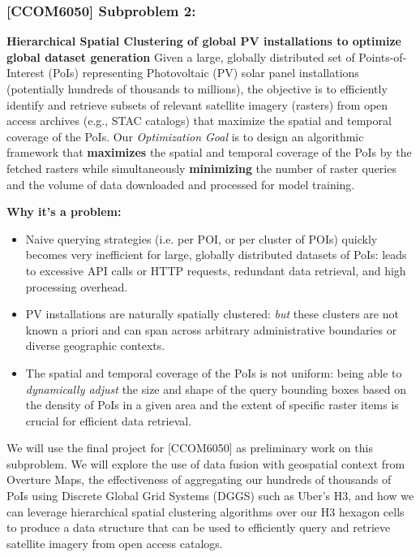 \subsubsection{[CCOM6050] Subproblem 2:} 
    \textbf{Hierarchical Spatial Clustering of global PV installations to optimize global dataset generation} 
    Given a large, globally distributed set of Points-of-Interest (PoIs) representing Photovoltaic (PV) solar panel installations (potentially hundreds of thousands to millions), 
    the objective is to efficiently identify and retrieve subsets of relevant satellite imagery (rasters) from open access archives (e.g., STAC catalogs) that maximize the spatial and temporal coverage of the PoIs. 
    Our \textit{Optimization Goal} is to design an algorithmic framework that \textbf{maximizes} the spatial and temporal coverage of the PoIs by the fetched rasters while simultaneously 
    \textbf{minimizing} the number of raster queries and the volume of data downloaded and processed for model training. 

    \textbf{Why it's a problem:} 
    \begin{itemize}
        \item Naive querying strategies (i.e. per POI, or per cluster of POIs) quickly becomes very inefficient for large, globally distributed datasets of PoIs: 
        leads to excessive API calls or HTTP requests, redundant data retrieval, and high processing overhead.
        \item PV installations are naturally spatially clustered: \textit{but} these clusters are not known a priori and can span across arbitrary administrative boundaries or diverse geographic contexts.
        \item The spatial and temporal coverage of the PoIs is not uniform: being able to \textit{dynamically adjust} the size and shape of the query bounding boxes based on the density of PoIs in a given area and the extent of specific raster items is crucial for efficient data retrieval.
    \end{itemize}

    We will use the final project for [CCOM6050] as preliminary work on this subproblem. We will explore the use of data fusion with geospatial context from Overture Maps, the effectiveness of aggregating our hundreds of thousands of PoIs using Discrete Global Grid Systems (DGGS) such as Uber's H3, and how we can leverage hierarchical spatial clustering algorithms over our H3 hexagon cells to produce a data structure that can be used to efficiently query and retrieve
    satellite imagery from open access catalogs.  

